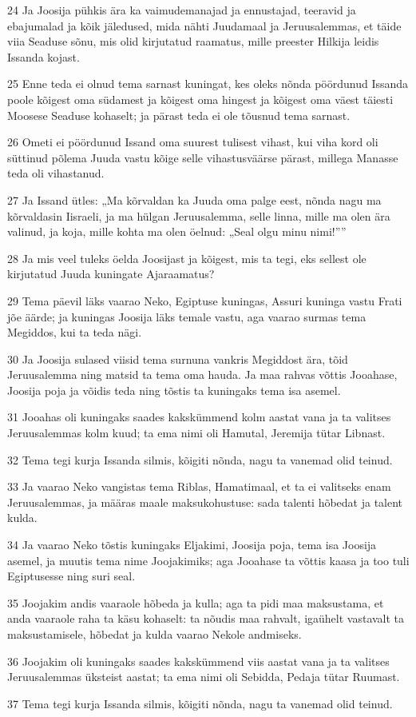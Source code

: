 \par 24 Ja Joosija pühkis ära ka vaimudemanajad ja ennustajad, teeravid ja ebajumalad ja kõik jäledused, mida nähti Juudamaal ja Jeruusalemmas, et täide viia Seaduse sõnu, mis olid kirjutatud raamatus, mille preester Hilkija leidis Issanda kojast.
\par 25 Enne teda ei olnud tema sarnast kuningat, kes oleks nõnda pöördunud Issanda poole kõigest oma südamest ja kõigest oma hingest ja kõigest oma väest täiesti Moosese Seaduse kohaselt; ja pärast teda ei ole tõusnud tema sarnast.
\par 26 Ometi ei pöördunud Issand oma suurest tulisest vihast, kui viha kord oli süttinud põlema Juuda vastu kõige selle vihastusväärse pärast, millega Manasse teda oli vihastanud.
\par 27 Ja Issand ütles: „Ma kõrvaldan ka Juuda oma palge eest, nõnda nagu ma kõrvaldasin Iisraeli, ja ma hülgan Jeruusalemma, selle linna, mille ma olen ära valinud, ja koja, mille kohta ma olen öelnud: „Seal olgu minu nimi!””
\par 28 Ja mis veel tuleks öelda Joosijast ja kõigest, mis ta tegi, eks sellest ole kirjutatud Juuda kuningate Ajaraamatus?
\par 29 Tema päevil läks vaarao Neko, Egiptuse kuningas, Assuri kuninga vastu Frati jõe äärde; ja kuningas Joosija läks temale vastu, aga vaarao surmas tema Megiddos, kui ta teda nägi.
\par 30 Ja Joosija sulased viisid tema surnuna vankris Megiddost ära, tõid Jeruusalemma ning matsid ta tema oma hauda. Ja maa rahvas võttis Jooahase, Joosija poja ja võidis teda ning tõstis ta kuningaks tema isa asemel.
\par 31 Jooahas oli kuningaks saades kakskümmend kolm aastat vana ja ta valitses Jeruusalemmas kolm kuud; ta ema nimi oli Hamutal, Jeremija tütar Libnast.
\par 32 Tema tegi kurja Issanda silmis, kõigiti nõnda, nagu ta vanemad olid teinud.
\par 33 Ja vaarao Neko vangistas tema Riblas, Hamatimaal, et ta ei valitseks enam Jeruusalemmas, ja määras maale maksukohustuse: sada talenti hõbedat ja talent kulda.
\par 34 Ja vaarao Neko tõstis kuningaks Eljakimi, Joosija poja, tema isa Joosija asemel, ja muutis tema nime Joojakimiks; aga Jooahase ta võttis kaasa ja too tuli Egiptusesse ning suri seal.
\par 35 Joojakim andis vaaraole hõbeda ja kulla; aga ta pidi maa maksustama, et anda vaaraole raha ta käsu kohaselt: ta nõudis maa rahvalt, igaühelt vastavalt ta maksustamisele, hõbedat ja kulda vaarao Nekole andmiseks.
\par 36 Joojakim oli kuningaks saades kakskümmend viis aastat vana ja ta valitses Jeruusalemmas üksteist aastat; ta ema nimi oli Sebidda, Pedaja tütar Ruumast.
\par 37 Tema tegi kurja Issanda silmis, kõigiti nõnda, nagu ta vanemad olid teinud.

